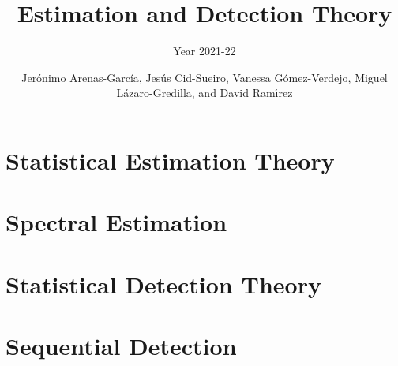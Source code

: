 \documentclass[graybox,envcountchap,sectrefs]{svmono_mod}
\begin{document}
\author{Jer\'onimo Arenas-Garc\'ia, Jes\'us Cid-Sueiro, Vanessa G\'omez-Verdejo, Miguel L\'azaro-Gredilla, and David Ram{\'\i}rez}
\title{Estimation and Detection Theory}
\subtitle{Year 2021-22}
\maketitle

\frontmatter%

%
%
%
%


\tableofcontents
%

\mainmatter%

%
\chapter{Statistical Estimation Theory}









\chapter{Spectral Estimation}


%

\chapter{Statistical Detection Theory}
\label{ch:SDT}



\chapter{Sequential Detection}
\label{sec:seq_det}

%


%


\backmatter%
%
%
\printindex
\end{document}
